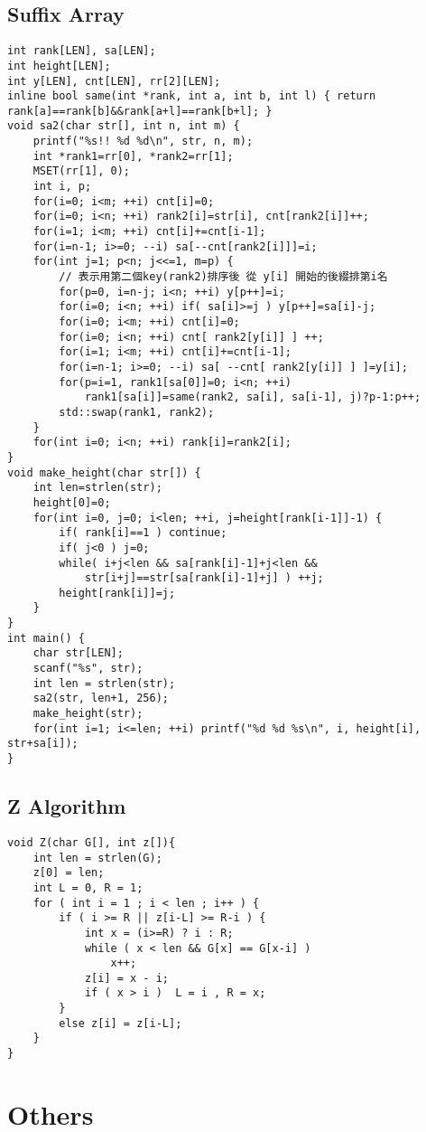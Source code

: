 \documentclass[11pt,twocolumn,a4paper]{article}
\begin{document}
\subsection{Suffix Array}
\begin{lstlisting}[label=Suffix Array]
int rank[LEN], sa[LEN];
int height[LEN];
int y[LEN], cnt[LEN], rr[2][LEN];
inline bool same(int *rank, int a, int b, int l) { return rank[a]==rank[b]&&rank[a+l]==rank[b+l]; }
void sa2(char str[], int n, int m) {
	printf("%s!! %d %d\n", str, n, m);
	int *rank1=rr[0], *rank2=rr[1];
	MSET(rr[1], 0);
	int i, p;
	for(i=0; i<m; ++i) cnt[i]=0;
	for(i=0; i<n; ++i) rank2[i]=str[i], cnt[rank2[i]]++;
	for(i=1; i<m; ++i) cnt[i]+=cnt[i-1];
	for(i=n-1; i>=0; --i) sa[--cnt[rank2[i]]]=i;
	for(int j=1; p<n; j<<=1, m=p) {
		// 表示用第二個key(rank2)排序後 從 y[i] 開始的後綴排第i名
		for(p=0, i=n-j; i<n; ++i) y[p++]=i;
		for(i=0; i<n; ++i) if( sa[i]>=j ) y[p++]=sa[i]-j;
		for(i=0; i<m; ++i) cnt[i]=0;
		for(i=0; i<n; ++i) cnt[ rank2[y[i]] ] ++;
		for(i=1; i<m; ++i) cnt[i]+=cnt[i-1];
		for(i=n-1; i>=0; --i) sa[ --cnt[ rank2[y[i]] ] ]=y[i];
		for(p=i=1, rank1[sa[0]]=0; i<n; ++i)
			rank1[sa[i]]=same(rank2, sa[i], sa[i-1], j)?p-1:p++;
		std::swap(rank1, rank2);
	}
	for(int i=0; i<n; ++i) rank[i]=rank2[i];
}
void make_height(char str[]) {
	int len=strlen(str);
	height[0]=0;
	for(int i=0, j=0; i<len; ++i, j=height[rank[i-1]]-1) {
		if( rank[i]==1 ) continue;
		if( j<0 ) j=0;
		while( i+j<len && sa[rank[i]-1]+j<len &&
			str[i+j]==str[sa[rank[i]-1]+j] ) ++j;
		height[rank[i]]=j;
	}
}
int main() {
	char str[LEN];
	scanf("%s", str);
	int len = strlen(str);
	sa2(str, len+1, 256);
	make_height(str);
	for(int i=1; i<=len; ++i) printf("%d %d %s\n", i, height[i], str+sa[i]);
}
\end{lstlisting}

\subsection{Z Algorithm}
\begin{lstlisting}[label=Z Algorithm]
void Z(char G[], int z[]){
	int len = strlen(G);
	z[0] = len;
	int L = 0, R = 1;
	for ( int i = 1 ; i < len ; i++ ) {
		if ( i >= R || z[i-L] >= R-i ) {
			int x = (i>=R) ? i : R;
			while ( x < len && G[x] == G[x-i] )  
				x++;
			z[i] = x - i;
			if ( x > i )  L = i , R = x;	
		}		
		else z[i] = z[i-L];
	}
}
\end{lstlisting}


\newpage
\section{Others}
\end{document}
